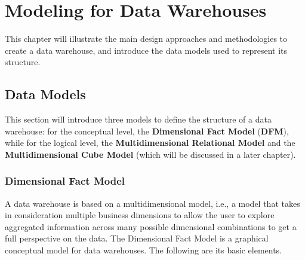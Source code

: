 \chapter{Modeling for Data Warehouses}

This chapter will illustrate the main design approaches and methodologies to create a data warehouse, and introduce the data models used to represent its structure.

\section{Data Models}

This section will introduce three models to define the structure of a data warehouse: for the conceptual level, the \textbf{Dimensional Fact Model} (\textbf{DFM}), while for the logical level, the \textbf{Multidimensional Relational Model} and the \textbf{Multidimensional Cube Model} (which will be discussed in a later chapter).

\subsection{Dimensional Fact Model}

A data warehouse is based on a multidimensional model, i.e., a model that takes in consideration multiple business dimensions to allow the user to explore aggregated information across many possible dimensional combinations to get a full perspective on the data. The Dimensional Fact Model is a graphical conceptual model for data warehouses. The following are its basic elements.

